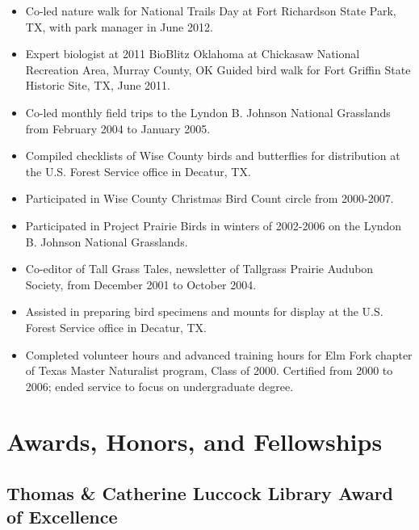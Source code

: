 \documentclass[
  letterpaper,
  DIV=11,
  numbers=noendperiod,
  oneside]{scrreprt}
\providecommand{\tightlist}{%
  \setlength{\itemsep}{0pt}\setlength{\parskip}{0pt}}\usepackage{longtable,booktabs,array}
\begin{document}
\begin{itemize}
\tightlist
\item
  Co-led nature walk for National Trails Day at Fort Richardson State
  Park, TX, with park manager in June 2012.
\item
  Expert biologist at 2011 BioBlitz Oklahoma at Chickasaw National
  Recreation Area, Murray County, OK Guided bird walk for Fort Griffin
  State Historic Site, TX, June 2011.
\item
  Co-led monthly field trips to the Lyndon B. Johnson National
  Grasslands from February 2004 to January 2005.
\item
  Compiled checklists of Wise County birds and butterflies for
  distribution at the U.S. Forest Service office in Decatur, TX.
\item
  Participated in Wise County Christmas Bird Count circle from
  2000-2007.
\item
  Participated in Project Prairie Birds in winters of 2002-2006 on the
  Lyndon B. Johnson National Grasslands.
\item
  Co-editor of Tall Grass Tales, newsletter of Tallgrass Prairie Audubon
  Society, from December 2001 to October 2004.
\item
  Assisted in preparing bird specimens and mounts for display at the
  U.S. Forest Service office in Decatur, TX.
\item
  Completed volunteer hours and advanced training hours for Elm Fork
  chapter of Texas Master Naturalist program, Class of 2000. Certified
  from 2000 to 2006; ended service to focus on undergraduate degree.
\end{itemize}


\chapter{Awards, Honors, and
Fellowships}\label{awards-honors-and-fellowships}

\section{Thomas \& Catherine Luccock Library Award of
Excellence}\label{thomas-catherine-luccock-library-award-of-excellence}

\end{document}
